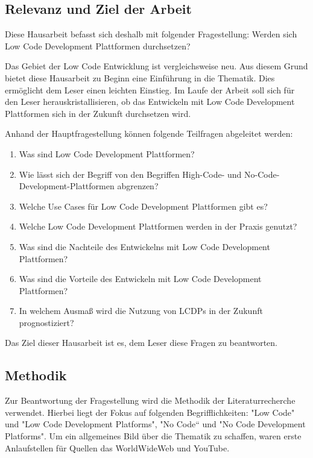 \documentclass[12pt]{article} %
\begin{document}
	\subsection{Relevanz und Ziel der Arbeit}	
	Diese Hausarbeit befasst sich deshalb mit folgender Fragestellung:\newline
			Werden sich Low Code Development Plattformen durchsetzen? \newline
			
	Das Gebiet der Low Code Entwicklung ist vergleichsweise neu. Aus diesem Grund bietet diese Hausarbeit zu Beginn eine Einführung in die Thematik. Dies ermöglicht dem Leser einen leichten Einstieg. Im Laufe der Arbeit soll sich für den Leser herauskristallisieren, ob das Entwickeln mit Low Code Development Plattformen sich in der Zukunft durchsetzen wird. \newline
	
	Anhand der Hauptfragestellung können folgende Teilfragen abgeleitet werden:
	\begin{enumerate}[label=(\roman*)]
		\setlength{\itemsep}{1pt}
		\item Was sind Low Code Development Plattformen? 
		\item Wie lässt sich der Begriff von den Begriffen High-Code- und No-Code-Development-Plattformen abgrenzen?
		\item Welche Use Cases für Low Code Development Plattformen gibt es? 
		\item Welche Low Code Development Plattformen werden in der Praxis genutzt?
		\item Was sind die Nachteile des Entwickelns mit Low Code Development Plattformen? 
		\item Was sind die Vorteile des Entwickeln mit Low Code Development Plattformen? 
		\item In welchem Ausmaß wird die Nutzung von LCDPs in der Zukunft prognostiziert?	
	\end{enumerate}

	Das Ziel dieser Hausarbeit ist es, dem Leser diese Fragen zu beantworten. 
	
	\subsection{Methodik}
	Zur Beantwortung der Fragestellung wird die Methodik der Literaturrecherche verwendet. Hierbei liegt der Fokus auf folgenden Begrifflichkeiten:
	"Low Code" und "Low Code Development Platforms", "No Code“ und "No Code Development Platforms". 
	Um ein allgemeines Bild über die Thematik zu schaffen, waren erste Anlaufstellen für Quellen das WorldWideWeb und YouTube. \newline
	
\end{document}
